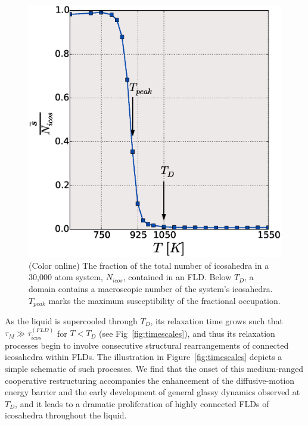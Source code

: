 \documentclass[aps,prl,preprint,showpacs,amsmath,floatfix,superscriptaddress]{revtex4}
\begin{document}
\begin{figure}[t]
\includegraphics[scale=0.38]{thesis_network_perc.eps}
\caption{(Color online) The fraction of the total number
of icosahedra in a 30,000 atom system, $N_{icos}$, contained
in an FLD. Below $T_{D}$, a domain
contains a macroscopic number of the system's icosahedra.
$T_{peak}$ marks the maximum susceptibility of the fractional
occupation.} \label{fig:perc_net}
\end{figure}

As the liquid is supercooled through $T_{D}$, its relaxation time
grows such that $\tau_{M} \gg \tau^{(FLD)}_{icos}$  for $T <
T_{D}$ (see Fig~\ref{fig:timescales}), and thus its relaxation
processes begin to involve consecutive structural rearrangements
of connected icosahedra within FLDs. The illustration in
Figure~\ref{fig:timescales} depicts a simple schematic of such
processes. We find that the onset of this medium-ranged
cooperative restructuring accompanies the enhancement of the
diffusive-motion energy barrier and the early development of
general glassy dynamics observed at $T_{D}$, and it leads to a
dramatic proliferation of highly connected FLDs of icosahedra
throughout the liquid.
\end{document}
